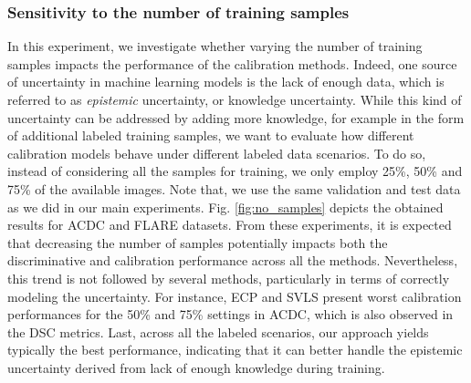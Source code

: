 \documentclass[twocolumn,final,10pt]{elsarticle}
\newcommand{\rev}[1]{{\color{black}#1}}
\begin{document}
\subsubsection{Sensitivity to the number of training samples}
\rev{In this experiment, we investigate whether varying the number of training samples impacts the performance of the calibration methods. Indeed, one source of uncertainty in machine learning models is the lack of enough data, which is referred to as \textit{epistemic} uncertainty, or knowledge uncertainty. While this kind of uncertainty can be addressed by adding more knowledge, for example in the form of additional labeled training samples, we want to evaluate how different calibration models behave under different labeled data scenarios. To do so, instead of considering all the samples for training, we only employ 25\%, 50\% and 75\% of the available images. Note that, we use the same validation and test data as we did in our main experiments. Fig. \ref{fig:no_samples} depicts the obtained results for ACDC and FLARE datasets. From these experiments, it is expected that decreasing the number of samples potentially impacts both the discriminative and calibration performance across all the methods. Nevertheless, this trend is not followed by several methods, particularly in terms of correctly modeling the uncertainty. For instance, ECP and SVLS present worst calibration performances for the 50\% and 75\% settings in ACDC, which is also observed in the DSC metrics. Last, across all the labeled scenarios, our approach yields typically the best performance, indicating that it can better handle the epistemic uncertainty derived from lack of enough knowledge during training.}
\end{document}
